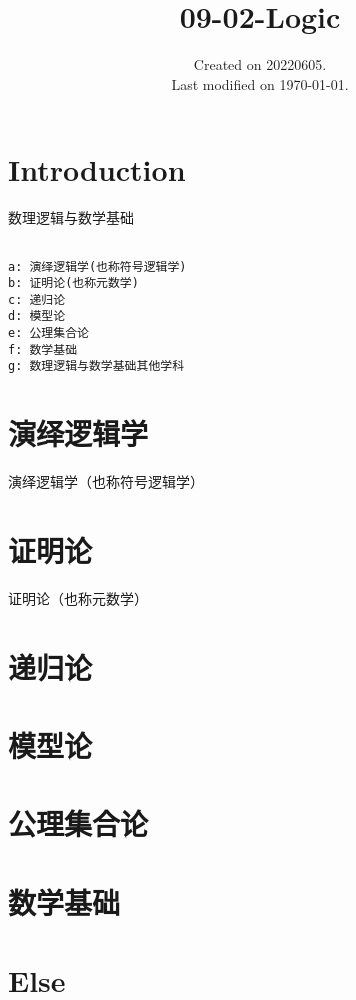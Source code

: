 \documentclass[UTF8]{../09-Mathematics}
\begin{document}
\title{09-02-Logic}
\date{Created on 20220605.\\   Last modified on \today.}
\maketitle
\tableofcontents


\chapter{Introduction}

数理逻辑与数学基础


\begin{lstlisting}

a: 演绎逻辑学(也称符号逻辑学)
b: 证明论(也称元数学)
c: 递归论
d: 模型论
e: 公理集合论
f: 数学基础
g: 数理逻辑与数学基础其他学科

\end{lstlisting}

\chapter{演绎逻辑学}
演绎逻辑学（也称符号逻辑学）

\chapter{证明论}
证明论（也称元数学）

\chapter{递归论}
\chapter{模型论}

\chapter{公理集合论}



\chapter{数学基础}
\chapter{Else}
\end{document}
